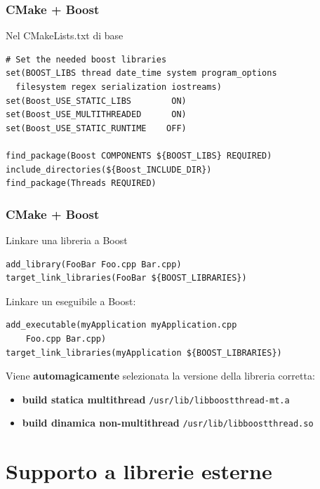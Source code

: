 \documentclass[10pt] {beamer}
\begin{document}
\begin{frame}[fragile]
 \frametitle{CMake + Boost}
Nel CMakeLists.txt di base
\begin{verbatim}
# Set the needed boost libraries 
set(BOOST_LIBS thread date_time system program_options 
  filesystem regex serialization iostreams)
set(Boost_USE_STATIC_LIBS        ON)
set(Boost_USE_MULTITHREADED      ON)
set(Boost_USE_STATIC_RUNTIME    OFF)

find_package(Boost COMPONENTS ${BOOST_LIBS} REQUIRED)
include_directories(${Boost_INCLUDE_DIR})
find_package(Threads REQUIRED)
\end{verbatim}

\end{frame}


\begin{frame}[fragile]
 \frametitle{CMake + Boost}
Linkare una libreria a Boost
\begin{small}
\begin{verbatim}
add_library(FooBar Foo.cpp Bar.cpp)
target_link_libraries(FooBar ${BOOST_LIBRARIES})
\end{verbatim}
\end{small}
Linkare un eseguibile a Boost:
\begin{small}
\begin{verbatim}
add_executable(myApplication myApplication.cpp 
    Foo.cpp Bar.cpp)
target_link_libraries(myApplication ${BOOST_LIBRARIES})
\end{verbatim}
\end{small}
Viene \textbf{automagicamente} selezionata la versione della libreria corretta:
\begin{itemize}
\item \textbf{build statica multithread} \verb_/usr/lib/libboost_\verb_thread-mt.a_
\item \textbf{build dinamica non-multithread} \verb_/usr/lib/libboost_\verb_thread.so_
\end{itemize}
\end{frame}

\section{Supporto a librerie esterne}
\end{document}
